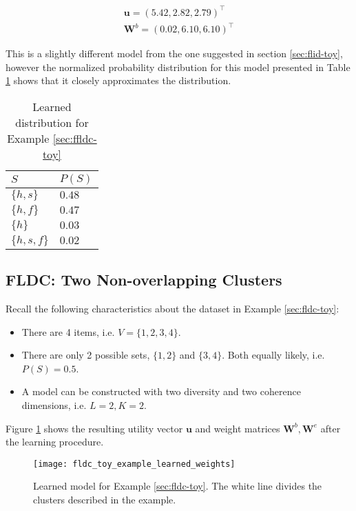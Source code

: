 \begin{align*}
  \mathbf{u} = \left(5.42,2.82,2.79\right)^{\intercal} \\
  \mathbf{W}^{b} = \left(0.02, 6.10, 6.10\right)^{\intercal}
\end{align*}

This is a slightly different model from the one suggested in section \ref{sec:flid-toy}, however the normalized probability distribution for this model presented in Table \ref{tab:flid-toy-learned-probs} shows that it closely approximates the distribution.

\begin{table}
  \centering
  \caption{Learned distribution for Example \ref{sec:ffldc-toy}}
  \begin{tabular}{@{}ll@{}}
    \toprule
    $S$ & $P(S)$\\
    \midrule
    $\{h,s\}$ & $0.48$ \\
    $\{h,f\}$ & $0.47$ \\
    $\{h\}$ & $0.03$ \\
    $\{h,s,f\}$ & $0.02$ \\
    \bottomrule
  \end{tabular}
  \label{tab:flid-toy-learned-probs}
\end{table}

\subsection{FLDC: Two Non-overlapping Clusters}

Recall the following characteristics about the dataset in Example \ref{sec:fldc-toy}:

\begin{itemize}
  \item There are 4 items, i.e. $V = \{1,2,3,4\}$.
  \item There are only 2 possible sets, $\{1,2\}$ and $\{3,4\}$. Both equally likely, i.e. $P(S) = 0.5$.
  \item A model can be constructed with two diversity and two coherence dimensions, i.e. $L=2,K=2$.
\end{itemize}

Figure \ref{fig:fldc-toy-learned-weights} shows the resulting utility vector $\mathbf{u}$ and weight matrices $\mathbf{W}^{b}, \mathbf{W}^{e}$ after the learning procedure.

\begin{figure}
  \centering
  \texttt{[image: fldc\_toy\_example\_learned\_weights]}
  \caption{Learned model for Example \ref{sec:fldc-toy}. The white line divides the clusters described in the example.}
  \label{fig:fldc-toy-learned-weights}
\end{figure}

